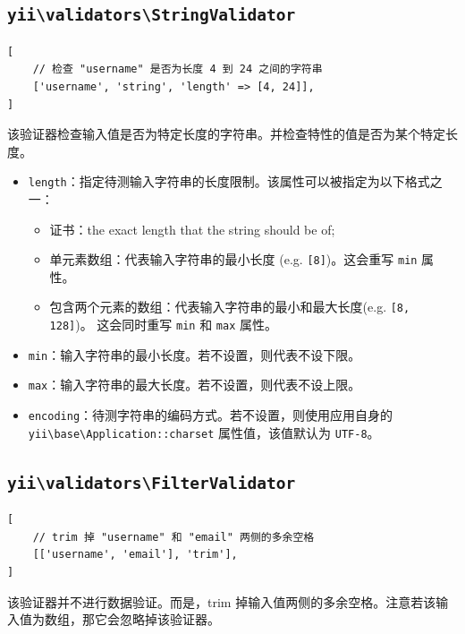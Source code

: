 \subsection{\texttt{yii{\allowbreak{}\textbackslash}validators{\allowbreak{}\textbackslash}StringValidator} \label{tutorial-core-validators.md::string}}
\lstset{language=php}\begin{lstlisting}
[
    // 检查 "username" 是否为长度 4 到 24 之间的字符串
    ['username', 'string', 'length' => [4, 24]],
]
\end{lstlisting}
该验证器检查输入值是否为特定长度的字符串。并检查特性的值是否为某个特定长度。

\begin{itemize}
\item \lstinline|length|：指定待测输入字符串的长度限制。该属性可以被指定为以下格式之一：\begin{itemize}
\item 证书：the exact length that the string should be of;
\item 单元素数组：代表输入字符串的最小长度 (e.g. \lstinline|[8]|)。这会重写 \lstinline|min| 属性。
\item 包含两个元素的数组：代表输入字符串的最小和最大长度(e.g. \lstinline|[8, 128]|)。
   这会同时重写 \lstinline|min| 和 \lstinline|max| 属性。
\end{itemize}

\item \lstinline|min|：输入字符串的最小长度。若不设置，则代表不设下限。
\item \lstinline|max|：输入字符串的最大长度。若不设置，则代表不设上限。
\item \lstinline|encoding|：待测字符串的编码方式。若不设置，则使用应用自身的 \texttt{yii{\allowbreak{}\textbackslash}base{\allowbreak{}\textbackslash}Application\allowbreak{}::\allowbreak{}charset} 属性值，该值默认为 \lstinline|UTF-8|。
\end{itemize}
\subsection{\texttt{yii{\allowbreak{}\textbackslash}validators{\allowbreak{}\textbackslash}FilterValidator} \label{tutorial-core-validators.md::trim}}
\lstset{language=php}\begin{lstlisting}
[
    // trim 掉 "username" 和 "email" 两侧的多余空格
    [['username', 'email'], 'trim'],
]
\end{lstlisting}
该验证器并不进行数据验证。而是，trim 掉输入值两侧的多余空格。注意若该输入值为数组，那它会忽略掉该验证器。

